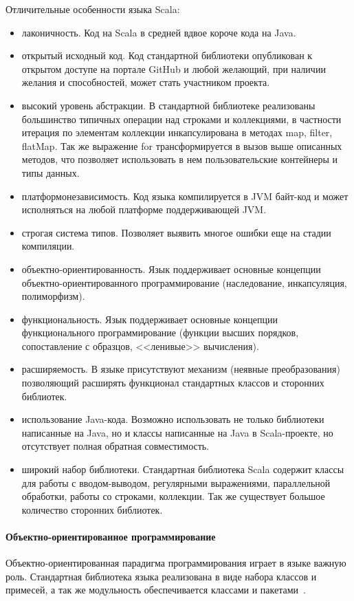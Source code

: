 Отличительные особенности языка Scala:
\begin{itemize}
  \item лаконичность. Код на Scala в средней вдвое короче кода на Java.
  \item открытый исходный код. Код стандартной библиотеки опубликован к открытом доступе на портале GitHub и любой желающий, при наличии желания и способностей, может стать участником проекта.
  \item высокий уровень абстракции. В стандартной библиотеке реализованы большинство типичных операции над строками и коллекциями, в частности итерация по элементам коллекции инкапсулирована в методах map, filter, flatMap. Так же выражение for трансформируется в вызов выше описанных методов, что позволяет использовать в нем пользовательские контейнеры и типы данных. 
  \item платформонезависимость. Код языка компилируется в JVM байт-код и может исполняться на любой платформе поддерживающей JVM.
  \item строгая система типов. Позволяет выявить многое ошибки еще на стадии компиляции.
  \item объектно-ориентированность. Язык поддерживает основные концепции объектно-ориентированного программирование (наследование, инкапсуляция, полиморфизм).
  \item функциональность. Язык поддерживает основные концепции функционального программирование (функции высших порядков, сопоставление с образцов, <<ленивые>> вычисления).
  \item расширяемость. В языке присутствуют механизм (неявные преобразования) позволяющий расширять функционал стандартных классов и сторонних библиотек.
  \item использование Java-кода. Возможно использовать не только библиотеки написанные на Java, но и классы написанные на Java в Scala-проекте, но отсутствует полная обратная совместимость.
  \item широкий набор библиотеки. Стандартная библиотека Scala содержит классы для работы с вводом-выводом, регулярными выражениями, параллельной обработки, работы со строками, коллекции. Так же существует большое количество сторонних библиотек.
\end{itemize}

\paragraph{Объектно-ориентированное программирование}
Объектно-ориентированная парадигма программирования играет в языке важную роль. Стандартная библиотека языка реализована в виде набора классов и примесей, а так же модульность обеспечивается классами и пакетами~\cite{horsman_scala}.

